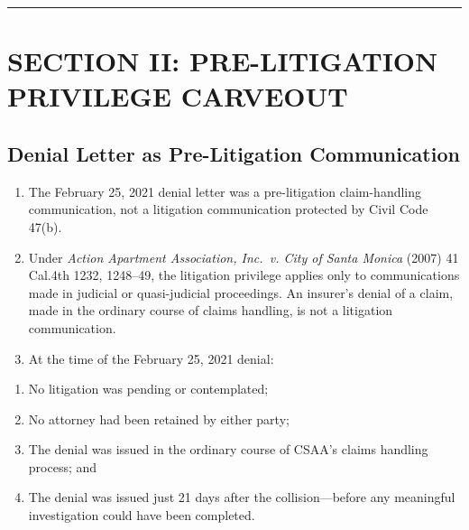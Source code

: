 \begin{center}\rule{0.5\linewidth}{0.5pt}\end{center}

\label{toc:section-ii-prelitigation-privilege-carveout}
\section{SECTION II: PRE-LITIGATION PRIVILEGE CARVEOUT}\label{section-ii-pre-litigation-privilege-carveout}

\subsection{Denial Letter as Pre-Litigation Communication}\label{denial-letter-as-pre-litigation-communication}

\begin{enumerate}
\def\labelenumi{\arabic{enumi}.}
\setcounter{enumi}{13}
\item
  The February 25, 2021 denial letter was a pre-litigation claim-handling communication, not a litigation communication protected by Civil Code \textsection{} 47(b).
\item
  Under \emph{Action Apartment Association, Inc.~v. City of Santa Monica} (2007) 41 Cal.4th 1232, 1248--49, the litigation privilege applies only to communications made in judicial or quasi-judicial proceedings. An insurer's denial of a claim, made in the ordinary course of claims handling, is not a litigation communication.
\item
  At the time of the February 25, 2021 denial:
\end{enumerate}

\begin{enumerate}
\def\labelenumi{(\alph{enumi})}
\item
  No litigation was pending or contemplated;
\item
  No attorney had been retained by either party;
\item
  The denial was issued in the ordinary course of CSAA's claims handling process; and
\item
  The denial was issued just 21 days after the collision---before any meaningful investigation could have been completed.
\end{enumerate}

